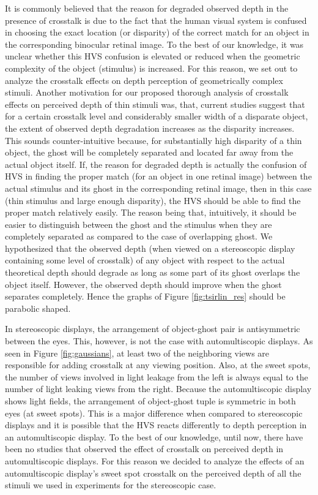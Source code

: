It is commonly believed that the reason for degraded observed depth in the presence of crosstalk is due to the fact that the human visual system is confused in choosing the exact location (or disparity) of the correct match for an object in the corresponding binocular retinal image. To the best of our knowledge, it was unclear whether this HVS confusion is elevated or reduced when the geometric complexity of the object (stimulus) is increased. For this reason, we set out to analyze the crosstalk effects on depth perception of geometrically complex stimuli. Another motivation for our proposed thorough analysis of crosstalk effects on perceived depth of thin stimuli was, that, current studies suggest that for a certain crosstalk level and considerably smaller width of a disparate object, the extent of observed depth degradation increases as the disparity increases. This sounds counter-intuitive because, for substantially high disparity of a thin object, the ghost will be completely separated and located far away from the actual object itself. If, the reason for degraded depth is actually the confusion of HVS in finding the proper match (for an object in one retinal image) between the actual stimulus and its ghost in the corresponding retinal image, then in this case (thin stimulus and large enough disparity), the HVS should be able to find the proper match relatively easily. The reason being that, intuitively, it should be easier to distinguish between the ghost and the stimulus when they are completely separated as compared to the case of overlapping ghost. We hypothesized that the observed depth (when viewed on a stereoscopic display containing some level of crosstalk) of any object with respect to the actual theoretical depth should degrade as long as some part of its ghost overlaps the object itself. However, the observed depth should improve when the ghost separates completely. Hence the graphs of Figure \ref{fig:tsirlin_res} should be parabolic shaped.

In stereoscopic displays, the arrangement of object-ghost pair is antisymmetric between the eyes. This, however, is not the case with automultiscopic displays. As seen in Figure \ref{fig:gaussians}, at least two of the neighboring views are responsible for adding crosstalk at any viewing position. Also, at the sweet spots, the number of views involved in light leakage from the left is always equal to the number of light leaking views from the right. Because the automultiscopic display shows light fields, the arrangement of object-ghost tuple is symmetric in both eyes (at sweet spots). This is a major difference when compared to stereoscopic displays and it is possible that the HVS reacts differently to depth perception in an automultiscopic display. To the best of our knowledge, until now, there have been no studies that observed the effect of crosstalk on perceived depth in automultiscopic displays. For this reason we decided to analyze the effects of an automultiscopic display's sweet spot crosstalk on the perceived depth of all the stimuli we used in experiments for the stereoscopic case.

